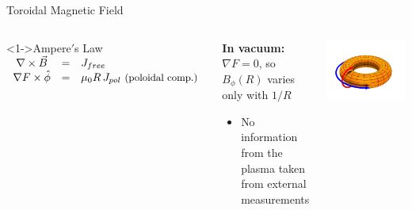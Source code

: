 \documentclass{beamer}
\begin{document}
\begin{frame}{Toroidal Magnetic Field}
\begin{columns}
\begin{block}<1->{Ampere$'$s Law}
$ \begin{array}{ccl}    
   		\nabla \times \vec{B} &= & J_{free} \\
		\nabla F \times \hat{\phi} &=&  \mu_0 R \, J_{pol}   \textrm{ \small (poloidal comp.)}
  \end{array} $
\end{block}	

   \begin{itemize}
   	 {\item  \textbf{In vacuum:} $ \nabla F =0$, so $B_\phi (R)$ varies only  with $1 / R$ 
   	\begin{itemize}
   		\item  No information from the plasma  taken from external measurements
 	\end{itemize}
	}
   \end{itemize}
    

	\begin{center}
	
	\includegraphics[trim = 2mm 5mm 2mm 5mm, clip, width=.8\columnwidth]{torsurf.png}
	

\end{center}
\end{columns}
\end{frame}
\end{document}
